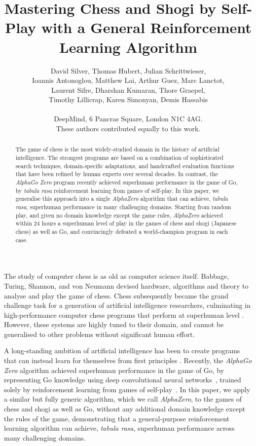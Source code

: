 \documentclass[12pt]{article}
\title{Mastering Chess and Shogi by Self-Play with a General Reinforcement Learning Algorithm}
\date{}
\author
{
David Silver, 
Thomas Hubert,
Julian Schrittwieser,\\
Ioannis Antonoglou,
Matthew Lai,
Arthur Guez,
Marc Lanctot,\\
Laurent Sifre,
Dharshan Kumaran,
Thore Graepel,\\
Timothy Lillicrap,
Karen Simonyan,
Demis Hassabis
\\
\\
\normalsize{DeepMind, 6 Pancras Square, London N1C 4AG.}
\\
\normalsize{These authors contributed equally to this work.}
}
\begin{document}
\maketitle

\begin{abstract}
The game of chess is the most widely-studied domain in the history of artificial intelligence. The strongest programs are based on a combination of sophisticated search techniques, domain-specific adaptations, and handcrafted evaluation functions
that have been refined by human experts over several decades. In contrast, the \emph{AlphaGo Zero} program recently achieved superhuman performance in the game of Go, by \emph{tabula rasa} reinforcement learning from games of self-play. In this paper, we generalise this approach into a single \emph{AlphaZero} algorithm that  can achieve, \emph{tabula rasa}, superhuman performance in many challenging domains. Starting from random play, and given no domain knowledge except the game rules, \emph{AlphaZero} achieved within 24 hours a superhuman level of play in the games of chess and shogi (Japanese chess) as well as Go, and convincingly defeated a world-champion program in each case. 
\end{abstract}



The study of computer chess is as old as computer science itself. Babbage, Turing, Shannon, and von Neumann devised hardware, algorithms and theory to analyse and play the game of chess. Chess subsequently became the grand challenge task for a generation of artificial intelligence researchers, culminating in high-performance computer chess programs that perform at superhuman level \cite{Campbell02DeepBlue,FengHsiung02DeepBlue}. However, these systems are highly tuned to their domain, and cannot be generalised to other problems without significant human effort. 

A long-standing ambition of artificial intelligence has been to create programs that can instead learn for themselves from first principles \cite{samuel:recent}. Recently, the \emph{AlphaGo Zero} algorithm achieved superhuman performance in the game of Go, by representing Go knowledge using deep convolutional neural networks~\cite{maddison:deepgo,Silver16AG}, trained solely by reinforcement learning from games of self-play~\cite{Silver17AG0}. In this paper, we apply a similar but fully generic algorithm, which we call \emph{AlphaZero}, to the games of chess and shogi as well as Go, without any additional domain knowledge except the rules of the game, demonstrating that a general-purpose reinforcement learning algorithm can achieve, \emph{tabula rasa}, superhuman performance across many challenging domains.
\end{document}
